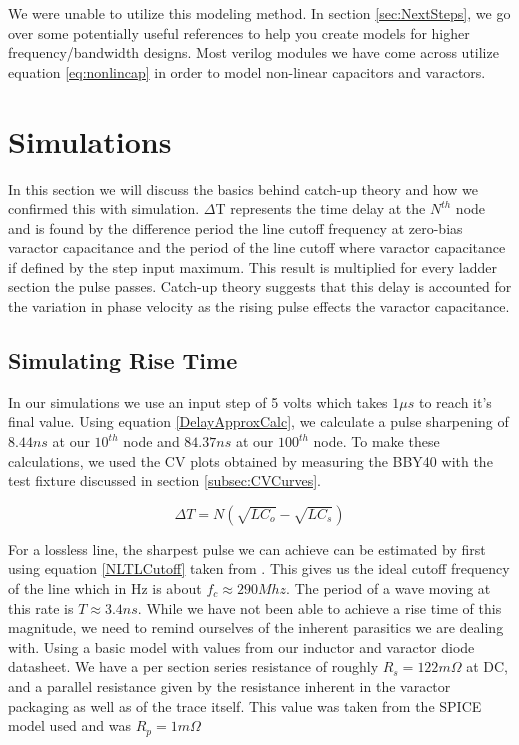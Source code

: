 \documentclass[journal]{IEEEtran} \usepackage[english]{babel}
\begin{document}
We were unable to utilize this modeling method. In section \ref{sec:NextSteps}, 
we go over some potentially useful references to help you create models for
higher frequency/bandwidth designs. Most verilog modules we have come across
utilize equation \ref{eq:nonlincap} in order to model non-linear capacitors and
varactors.







\section{ Simulations }

In this section we will discuss the basics behind catch-up
theory\cite{wilson1991pulse} and how we confirmed this with simulation.
$\Delta$T represents the time delay at the $N^{th}$ node and is found by the
difference period the line cutoff frequency at zero-bias varactor capacitance
and the period of the line cutoff where varactor capacitance if defined by the
step input maximum. This result is multiplied for every ladder section the pulse
passes. Catch-up theory suggests that this delay is accounted for the variation
in phase velocity as the rising pulse effects the varactor capacitance.

\subsection{Simulating Rise Time}

In our simulations we use an input step of 5 volts which takes $1\mu s$ to reach
it's final value. Using equation \ref{DelayApproxCalc}, we calculate a pulse
sharpening of $8.44ns$ at our $10^{th}$ node and $84.37ns$ at our $100^{th}$
node. To make these calculations, we used the CV plots obtained by measuring the
BBY40 with the test fixture discussed in section \ref{subsec:CVCurves}.


\begin{equation} \label{DelayApproxCalc}
    \Delta T = N(\sqrt{LC_{o}} - \sqrt{LC_{s}} )
\end{equation}

For a lossless line, the sharpest pulse we can achieve can be estimated by first
using equation \ref{NLTLCutoff} taken from \cite{wilson1991pulse}. This gives us
the ideal cutoff frequency of the line which in Hz is about $f_c \approx
290Mhz$. The period of a wave moving at this rate is $T \approx 3.4ns$. While we
have not been able to achieve a rise time of this magnitude, we need to remind
ourselves of the inherent parasitics we are dealing with. Using a basic model
with values from our inductor and varactor diode datasheet. We have a per
section series resistance of roughly $R_s = 122m\Omega$ at DC, and a parallel
resistance given by the resistance inherent in the varactor packaging as well as
of the trace itself. This value was taken from the SPICE model used and was
$R_{p} = 1m\Omega$
\end{document}
